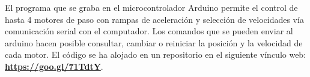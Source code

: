 El programa que se graba en el microcontrolador Arduino permite el
control de hasta 4 motores de paso con rampas de aceleración y
selección de velocidades vía comunicación serial con el computador. 
Los comandos que se pueden enviar al arduino hacen posible consultar,
cambiar o reiniciar la posición y la velocidad de cada motor.
El código se ha alojado en un repositorio en el siguiente vínculo web:
\\
\hspace*{\fill}\href{https://goo.gl/71TdtY}{\textbf{https://goo.gl/71TdtY}}.\hspace*{\fill}\\

